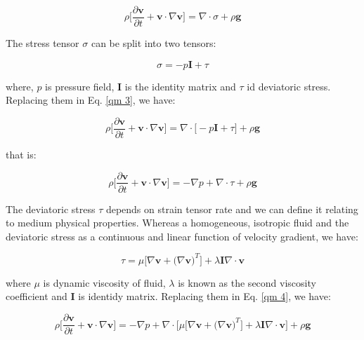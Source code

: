 \begin{equation} \label{qm 3}
 \rho \Bigg[ \frac{\partial \textbf{v}}{\partial t} + \textbf{v} \cdot \nabla \textbf{v} \Bigg]
 =
 \nabla \cdot \sigma
 +
 \rho \textbf{g}
\end{equation}

\medskip
\noindent
The stress tensor $\sigma$ can be split into
two tensors:

\begin{equation}
 \sigma = -p \textbf{I} + \tau
\end{equation}

\medskip
\noindent
where, $p$ is pressure field, \textbf{I} is the identity matrix and
$\tau$ id deviatoric stress. 
Replacing them in Eq. \ref{qm 3}, we have:

\begin{equation}
 \rho \Bigg[ \frac{\partial \textbf{v}}{\partial t} + \textbf{v} \cdot \nabla \textbf{v} \Bigg]
 =
 \nabla \cdot \big[ -p \textbf{I} + \tau \big]
 +
 \rho \textbf{g}
\end{equation}

\medskip
\noindent
that is:

\begin{equation} \label{qm 4}
 \rho \Bigg[ \frac{\partial \textbf{v}}{\partial t} + \textbf{v} \cdot \nabla \textbf{v} \Bigg]
 =
 -
 \nabla p
 +
 \nabla \cdot \tau
 +
 \rho \textbf{g}
\end{equation}

\medskip
The deviatoric stress $\tau$ depends on strain tensor rate and
we can define it relating to medium physical properties.
Whereas a homogeneous, isotropic fluid and the deviatoric stress
as a continuous and linear function of velocity gradient,
we have:

\begin{equation}
 \tau = \mu \big[ \nabla \textbf{v} + \big( \nabla \textbf{v} \big)^{T} \big]
      + \lambda \textbf{I} \nabla \cdot \textbf{v}
\end{equation}

\medskip
\noindent
where $\mu$ is dynamic viscosity of fluid,
$\lambda$ is known as the second viscosity coefficient and
\textbf{I} is identidy matrix.
Replacing them in Eq. \ref{qm 4}, we have:



\begin{equation} 
 \rho \Bigg[ \frac{\partial \textbf{v}}{\partial t} + \textbf{v} \cdot \nabla \textbf{v} \Bigg]
 =
 -
 \nabla p
 +
 \nabla \cdot \big[ 
 \mu \big[ \nabla \textbf{v} + \big( \nabla \textbf{v} \big)^{T} \big]
 + \lambda \textbf{I} \nabla \cdot \textbf{v}
 \big]
 +
 \rho \textbf{g}
\end{equation}



